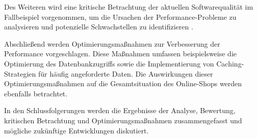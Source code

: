 Des Weiteren wird eine kritische Betrachtung der aktuellen Softwarequalität im Fallbeispiel vorgenommen, um die Ursachen der Performance-Probleme zu analysieren und potenzielle Schwachstellen zu identifizieren .

Abschließend werden Optimierungsmaßnahmen zur Verbesserung der Performance vorgeschlagen. Diese Maßnahmen umfassen beispielsweise die Optimierung des Datenbankzugriffs sowie die Implementierung von Caching-Strategien für häufig angeforderte Daten. Die Auswirkungen dieser Optimierungsmaßnahmen auf die Gesamtsituation des Online-Shops werden ebenfalls betrachtet.

In den Schlussfolgerungen werden die Ergebnisse der Analyse, Bewertung, kritischen Betrachtung und Optimierungsmaßnahmen zusammengefasst und mögliche zukünftige Entwicklungen diskutiert.


